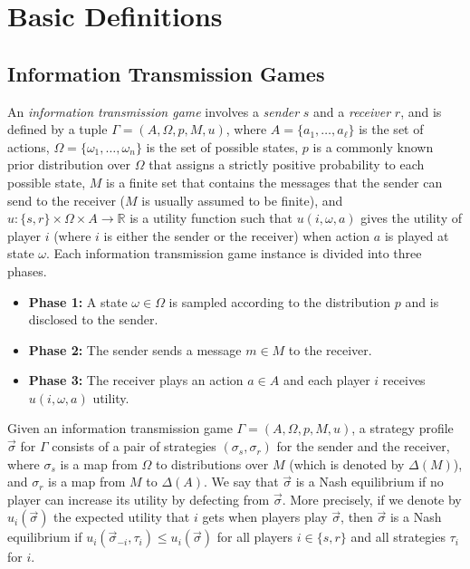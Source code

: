 \documentclass[submission,copyright,creativecommons]{eptcs}
\begin{document}
\section{Basic Definitions}\label{sec:model}

\subsection{Information Transmission Games}

An \emph{information transmission game} involves a \emph{sender} $s$ and a \emph{receiver} $r$, and is defined by a tuple $\Gamma = (A, \Omega, p, M, u)$, where $A = \{a_1, \ldots, a_\ell\}$ is the set of actions, $\Omega = \{\omega_1, \ldots, \omega_n\}$ is the set of possible states, $p$ is a commonly known prior distribution over $\Omega$ that assigns a strictly positive probability to each possible state, $M$ is a finite set that contains the messages that the sender can send to the receiver 
($M$ is usually assumed to be finite),
and $u : \{s, r\} \times \Omega \times A \longrightarrow \mathbb{R}$ is a utility function such that $u(i, \omega, a)$ gives the utility of player $i$ (where $i$ is either the sender or the receiver) when action $a$ is played at state $\omega$. Each information transmission game instance is divided into three phases. 
\begin{itemize}
    \item \textbf{Phase 1:} A state $\omega \in \Omega$ is sampled according to the distribution $p$ and is disclosed to the sender.
    \item \textbf{Phase 2:} The sender sends a message $m \in M$ to the receiver.
    \item \textbf{Phase 3:} The receiver plays an action $a \in A$ and each player $i$ receives $u(i, \omega, a)$ utility.
\end{itemize}

Given an information transmission game $\Gamma = (A, \Omega, p, M, u)$, a strategy profile $\vec{\sigma}$ for $\Gamma$ consists of a pair of strategies $(\sigma_s, \sigma_r)$ for the sender and the receiver, where $\sigma_s$ is a map from $\Omega$ to distributions over $M$ (which is denoted by $\Delta(M)$), and $\sigma_r$ is a map from $M$ to $\Delta(A)$.
We say that $\vec{\sigma}$ is a Nash equilibrium if no player can increase its utility by defecting from $\vec{\sigma}$. More precisely, if we denote by $u_i(\vec{\sigma})$ the expected utility that $i$ gets when players play $\vec{\sigma}$, then $\vec{\sigma}$ is a Nash equilibrium if $u_i(\vec{\sigma}_{-i}, \tau_i) \le u_i(\vec{\sigma})$ for all players $i \in \{s, r\}$ and all strategies $\tau_i$ for $i$.
\end{document}
